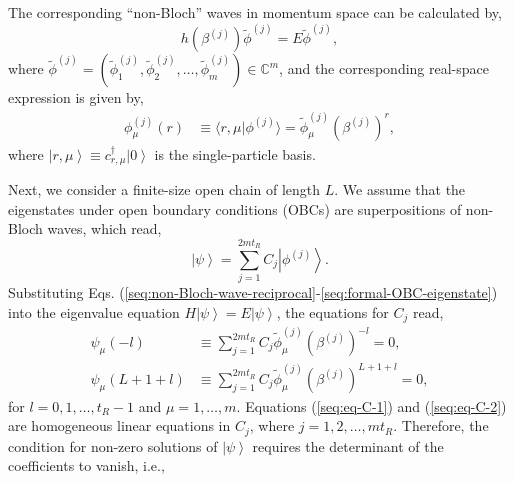 The corresponding ``non-Bloch'' waves in momentum space can be calculated
by, 
\begin{equation}
h\left(\beta^{(j)}\right)\tilde{\phi}^{(j)}=E\tilde{\phi}^{(j)},\label{seq:non-Bloch-wave-reciprocal}
\end{equation}
where $\tilde{\phi}^{(j)}=(\tilde{\phi}_{1}^{(j)},\tilde{\phi}_{2}^{(j)},\dots,\tilde{\phi}_{m}^{(j)})\in\mathbb{C}^{m}$,
and the corresponding real-space expression is given by, 
\begin{align}
\phi_{\mu}^{(j)}\left(r\right) & \equiv\langle r,\mu|\phi^{(j)}\rangle=\tilde{\phi}_{\mu}^{(j)}\left(\beta^{(j)}\right)^{r},
\end{align}
where $\left|r,\mu\right>\equiv c_{r,\mu}^{\dagger}\left|0\right>$
is the single-particle basis.

Next, we consider a finite-size open chain of length $L$. We assume
that the eigenstates under open boundary conditions (OBCs) are superpositions
of non-Bloch waves, which read, 
\begin{equation}
\left|\psi\right>=\sum_{j=1}^{2mt_{R}}C_{j}\left|\phi^{(j)}\right>.\label{seq:formal-OBC-eigenstate}
\end{equation}
Substituting Eqs. (\ref{seq:non-Bloch-wave-reciprocal}-\ref{seq:formal-OBC-eigenstate})
into the eigenvalue equation $H\left|\psi\right>=E\left|\psi\right>$,
the equations for $C_{j}$ read, 
\begin{align}
\psi_{\mu}\left(-l\right) & \equiv\sum_{j=1}^{2mt_{R}}C_{j}\tilde{\phi}_{\mu}^{(j)}\left(\beta^{(j)}\right)^{-l}=0,\label{seq:eq-C-1}\\
\psi_{\mu}\left(L+1+l\right) & \equiv\sum_{j=1}^{2mt_{R}}C_{j}\tilde{\phi}_{\mu}^{(j)}\left(\beta^{(j)}\right)^{L+1+l}=0,\label{seq:eq-C-2}
\end{align}
for $l=0,1,\dots,t_{R}-1$ and $\mu=1,\dots,m$. Equations (\ref{seq:eq-C-1})
and (\ref{seq:eq-C-2}) are homogeneous linear equations in $C_{j}$,
where $j=1,2,\dots,mt_{R}$. Therefore, the condition for non-zero
solutions of $\left|\psi\right>$ requires the determinant of the
coefficients to vanish, i.e., 
